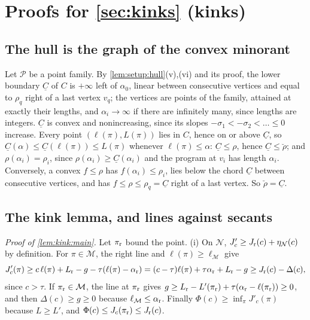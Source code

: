 \section{Proofs for \texorpdfstring{\cref{sec:kinks}}{Section \ref*{sec:kinks}} (kinks)}\label{app:kinks}

\subsection{The hull is the graph of the convex minorant}\label{app:kinks:hull}

Let $\mathcal P$ be a point family. By \cref{lem:setup:hull}(v),(vi) and its proof, the lower boundary $\underline C$ of $C$ is $+\infty$ left of $\alpha_0$, linear between consecutive vertices and equal to $\rho_q$ right of a last vertex $v_q$; the vertices are points of the family, attained at exactly their lengths, and $\alpha_i\to\infty$ if there are infinitely many, since lengths are integers. $\underline C$ is convex and nonincreasing, since its slopes $-\sigma_1<-\sigma_2<\dots\le0$ increase. Every point $(\ell(\pi),L(\pi))$ lies in $C$, hence on or above $\underline C$, so $\underline C(\alpha)\le \underline C(\ell(\pi))\le L(\pi)$ whenever $\ell(\pi)\le\alpha$: $\underline C\le\rho$, hence $\underline C\le\breve\rho$; and $\rho(\alpha_i)=\rho_i$, since $\rho(\alpha_i)\ge \underline C(\alpha_i)$ and the program at $v_i$ has length $\alpha_i$. Conversely, a convex $f\le\rho$ has $f(\alpha_i)\le\rho_i$, lies below the chord $\underline C$ between consecutive vertices, and has $f\le\rho\le\rho_q=\underline C$ right of a last vertex. So $\breve\rho=\underline C$.

\subsection{The kink lemma, and lines against secants}\label{app:kinks:lemma}

\emph{Proof of \cref{lem:kink:main}.} Let $\pi_{\rm r}$ bound the point. (i) On $\mathcal N$, $J'_c\ge J_{\rm r}(c)+\eta_{\mathcal N}(c)$ by definition. For $\pi\in\mathcal M$, the right line and $\ell(\pi)\ge\ell_{\mathcal M}$ give
\[
J'_c(\pi)\ge c\,\ell(\pi)+L_{\rm r}-g-\tau(\ell(\pi)-\alpha_{\rm r})=(c-\tau)\ell(\pi)+\tau\alpha_{\rm r}+L_{\rm r}-g\ge J_{\rm r}(c)-\Delta(c),
\]
since $c>\tau$. If $\pi_{\rm r}\in\mathcal M$, the line at $\pi_{\rm r}$ gives $g\ge L_{\rm r}-L'(\pi_{\rm r})+\tau(\alpha_{\rm r}-\ell(\pi_{\rm r}))\ge0$, and then $\Delta(c)\ge g\ge0$ because $\ell_{\mathcal M}\le\alpha_{\rm r}$. Finally $\Phi(c)\ge\inf_\pi J'_c(\pi)$ because $L\ge L'$, and $\Phi(c)\le J_c(\pi_{\rm r})\le J_{\rm r}(c)$.

